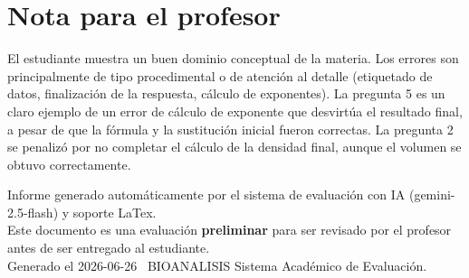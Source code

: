 \documentclass[11pt,a4paper]{article}
\begin{document}
\section*{Nota para el profesor}
\begin{tcolorbox}[
  enhanced, breakable,
  colback=yellow!8, colframe=yellow!60!black,
  fonttitle=\bfseries, coltitle=black,
  title={Observaciones para revisión manual},
  top=4pt, bottom=4pt, left=8pt, right=8pt,
]
El estudiante muestra un buen dominio conceptual de la materia. Los errores son principalmente de tipo procedimental o de atención al detalle (etiquetado de datos, finalización de la respuesta, cálculo de exponentes). La pregunta 5 es un claro ejemplo de un error de cálculo de exponente que desvirtúa el resultado final, a pesar de que la fórmula y la sustitución inicial fueron correctas. La pregunta 2 se penalizó por no completar el cálculo de la densidad final, aunque el volumen se obtuvo correctamente.
\end{tcolorbox}

\vspace{12pt}
\begin{center}
  \footnotesize\color{gray}
  Informe generado automáticamente por el sistema de evaluación con IA (gemini-2.5-flash) y soporte LaTex. \\
  Este documento es una evaluación \textbf{preliminar} para ser revisado por el profesor antes de ser entregado al 
  estudiante. \\
  Generado el 2026-06-26 \textbullet\ BIOANALISIS Sistema Académico de Evaluación.
  \end{center}
\end{document}
